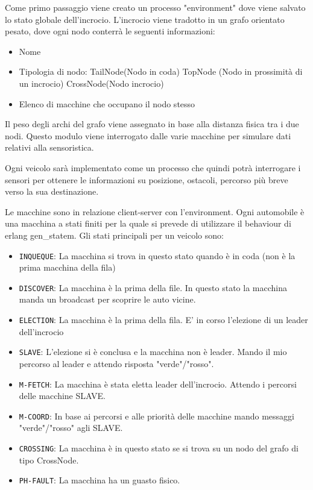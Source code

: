 \documentclass{memoir}
\begin{document}





Come primo passaggio viene creato un processo "environment" dove viene salvato
lo stato globale dell'incrocio. L'incrocio viene tradotto in un grafo orientato
pesato, dove ogni nodo conterrà le seguenti informazioni:
\begin{itemize}
\item Nome
\item Tipologia di nodo: TailNode(Nodo in coda) TopNode (Nodo in prossimità di
  un incrocio) CrossNode(Nodo incrocio)
\item Elenco di macchine che occupano il nodo stesso
\end{itemize}
Il peso degli archi del grafo viene assegnato in base alla distanza fisica tra i
due nodi.
Questo modulo viene interrogato dalle varie macchine per simulare dati relativi
alla sensoristica.

Ogni veicolo sarà implementato come un processo che quindi potrà interrogare i
sensori per ottenere le informazioni su posizione, ostacoli, percorso più breve
verso la sua destinazione.

Le macchine sono in relazione client-server con l'environment. Ogni automobile è
una macchina a stati finiti per la quale si prevede di utilizzare il behaviour
di erlang gen\_statem. Gli stati principali per un veicolo sono:
\begin{itemize}
\item \texttt{INQUEQUE}: La macchina si trova in questo stato quando è in coda
  (non è la prima macchina della fila)
\item \texttt{DISCOVER}: La macchina è la prima della file. In questo stato la
  macchina manda un broadcast per scoprire le auto vicine.
\item \texttt{ELECTION}: La macchina è la prima della fila. E' in corso
  l'elezione di un leader dell'incrocio
\item \texttt{SLAVE}: L'elezione si è conclusa e la macchina non è leader. Mando
  il mio percorso al leader e attendo risposta "verde"/"rosso".
\item \texttt{M-FETCH}: La macchina è stata eletta leader dell'incrocio. Attendo
  i percorsi delle macchine SLAVE.
\item \texttt{M-COORD}: In base ai percorsi e alle priorità delle macchine mando
  messaggi "verde"/"rosso" agli SLAVE.
\item \texttt{CROSSING}: La macchina è in questo stato se si trova su un nodo
  del grafo di tipo CrossNode.
\item \texttt{PH-FAULT}: La macchina ha un guasto fisico.
\end{itemize}
\end{document}
